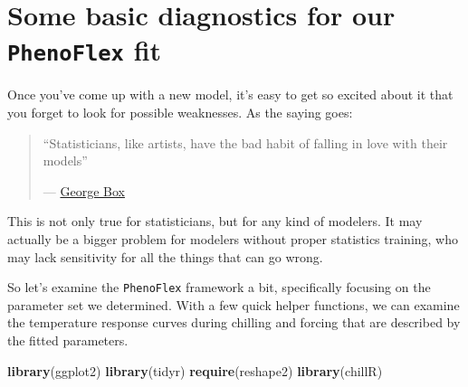 \documentclass[
]{book}
\newenvironment{Shaded}{\begin{snugshade}}{\end{snugshade}}
\newcommand{\KeywordTok}[1]{\textcolor[rgb]{0.13,0.29,0.53}{\textbf{#1}}}
\newcommand{\NormalTok}[1]{#1}
\begin{document}
\hypertarget{some-basic-diagnostics-for-our-phenoflex-fit}{%
\section{\texorpdfstring{Some basic diagnostics for our \texttt{PhenoFlex} fit}{Some basic diagnostics for our PhenoFlex fit}}\label{some-basic-diagnostics-for-our-phenoflex-fit}}

Once you've come up with a new model, it's easy to get so excited about it that you forget to look for possible weaknesses. As the saying goes:

\begin{quote}
``Statisticians, like artists, have the bad habit of falling in love with their models''

\hfill --- \href{https://en.wikipedia.org/wiki/George_E._P._Box}{George Box}
\end{quote}

This is not only true for statisticians, but for any kind of modelers. It may actually be a bigger problem for modelers without proper statistics training, who may lack sensitivity for all the things that can go wrong.

So let's examine the \texttt{PhenoFlex} framework a bit, specifically focusing on the parameter set we determined. With a few quick helper functions, we can examine the temperature response curves during chilling and forcing that are described by the fitted parameters.

\begin{Shaded}
\begin{Highlighting}[]
\KeywordTok{library}\NormalTok{(ggplot2)}
\KeywordTok{library}\NormalTok{(tidyr)}
\KeywordTok{require}\NormalTok{(reshape2)}
\KeywordTok{library}\NormalTok{(chillR)}
\end{Highlighting}
\end{Shaded}
\end{document}
